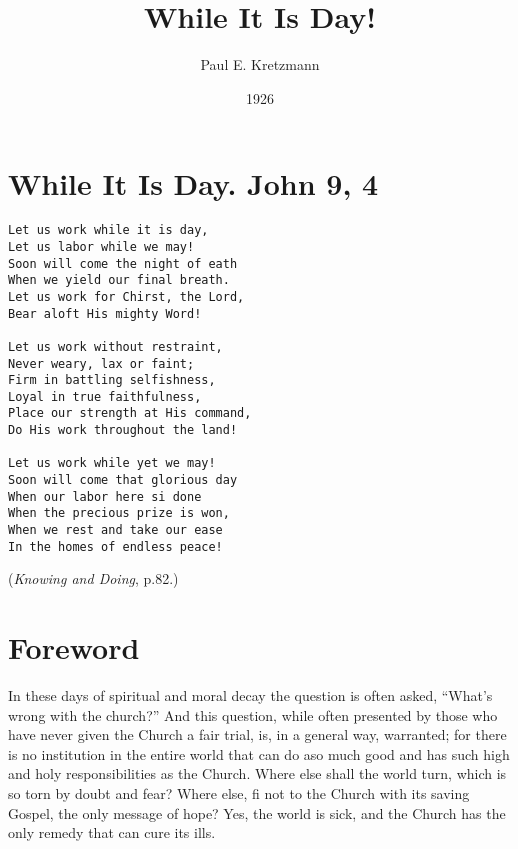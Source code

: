 \documentclass[
]{book}
\title{While It Is Day!}
\author{Paul E. Kretzmann}
\date{1926}
\begin{document}
\maketitle

{
\setcounter{tocdepth}{1}
\tableofcontents
}
\hypertarget{while-it-is-day.-john-9-4}{%
\chapter*{While It Is Day. John 9, 4}\label{while-it-is-day.-john-9-4}}

\begin{verbatim}
Let us work while it is day,
Let us labor while we may!
Soon will come the night of eath
When we yield our final breath.
Let us work for Chirst, the Lord,
Bear aloft His mighty Word!

Let us work without restraint,
Never weary, lax or faint;
Firm in battling selfishness,
Loyal in true faithfulness,
Place our strength at His command,
Do His work throughout the land!

Let us work while yet we may!
Soon will come that glorious day
When our labor here si done
When the precious prize is won,
When we rest and take our ease
In the homes of endless peace!
\end{verbatim}

(\emph{Knowing and Doing}, p.82.)

\hypertarget{foreword}{%
\chapter*{Foreword}\label{foreword}}

In these days of spiritual and moral decay the question is often asked, ``What's wrong with the church?'' And this question, while often presented by those who have never given the Church a fair trial, is, in a general way, warranted; for there is no institution in the entire world that can do aso much good and has such high and holy responsibilities as the Church. Where else shall the world turn, which is so torn by doubt and fear? Where else, fi not to the Church with its saving Gospel, the only message of hope? Yes, the world is sick, and the Church has the only remedy that can cure its ills.
\end{document}
